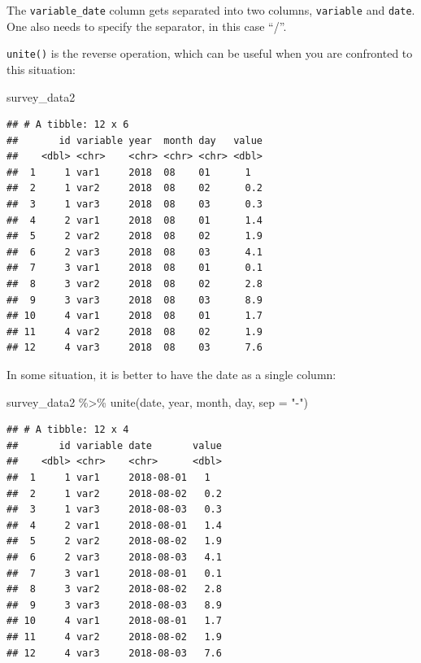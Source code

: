 \documentclass[
]{article}
\newenvironment{Shaded}{\begin{snugshade}}{\end{snugshade}}
\newcommand{\AttributeTok}[1]{\textcolor[rgb]{0.77,0.63,0.00}{#1}}
\newcommand{\FunctionTok}[1]{\textcolor[rgb]{0.00,0.00,0.00}{#1}}
\newcommand{\NormalTok}[1]{#1}
\newcommand{\SpecialCharTok}[1]{\textcolor[rgb]{0.00,0.00,0.00}{#1}}
\newcommand{\StringTok}[1]{\textcolor[rgb]{0.31,0.60,0.02}{#1}}
\begin{document}
The \texttt{variable\_date} column gets separated into two columns, \texttt{variable} and \texttt{date}. One also needs
to specify the separator, in this case ``/''.

\texttt{unite()} is the reverse operation, which can be useful when you are confronted to this situation:

\begin{Shaded}
\begin{Highlighting}[]
\NormalTok{survey\_data2}
\end{Highlighting}
\end{Shaded}

\begin{verbatim}
## # A tibble: 12 x 6
##       id variable year  month day   value
##    <dbl> <chr>    <chr> <chr> <chr> <dbl>
##  1     1 var1     2018  08    01      1  
##  2     1 var2     2018  08    02      0.2
##  3     1 var3     2018  08    03      0.3
##  4     2 var1     2018  08    01      1.4
##  5     2 var2     2018  08    02      1.9
##  6     2 var3     2018  08    03      4.1
##  7     3 var1     2018  08    01      0.1
##  8     3 var2     2018  08    02      2.8
##  9     3 var3     2018  08    03      8.9
## 10     4 var1     2018  08    01      1.7
## 11     4 var2     2018  08    02      1.9
## 12     4 var3     2018  08    03      7.6
\end{verbatim}

In some situation, it is better to have the date as a single column:

\begin{Shaded}
\begin{Highlighting}[]
\NormalTok{survey\_data2 }\SpecialCharTok{\%\textgreater{}\%}
    \FunctionTok{unite}\NormalTok{(date, year, month, day, }\AttributeTok{sep =} \StringTok{"{-}"}\NormalTok{)}
\end{Highlighting}
\end{Shaded}

\begin{verbatim}
## # A tibble: 12 x 4
##       id variable date       value
##    <dbl> <chr>    <chr>      <dbl>
##  1     1 var1     2018-08-01   1  
##  2     1 var2     2018-08-02   0.2
##  3     1 var3     2018-08-03   0.3
##  4     2 var1     2018-08-01   1.4
##  5     2 var2     2018-08-02   1.9
##  6     2 var3     2018-08-03   4.1
##  7     3 var1     2018-08-01   0.1
##  8     3 var2     2018-08-02   2.8
##  9     3 var3     2018-08-03   8.9
## 10     4 var1     2018-08-01   1.7
## 11     4 var2     2018-08-02   1.9
## 12     4 var3     2018-08-03   7.6
\end{verbatim}
\end{document}
